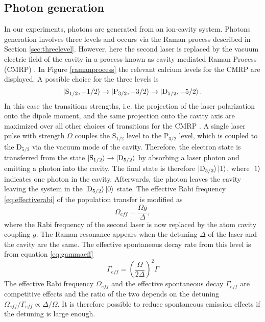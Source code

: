 \subsection{Photon generation}
\label{sec:ramanprocess}
In our experiments, photons are generated from an ion-cavity system. Photons generation involves three levels and occurs via the Raman process described in Section \ref{sec:threelevel}. However, here the second laser is replaced by the vacuum electric field of the cavity in a process known as cavity-mediated Raman Process (CMRP) \cite{stuteinterface}. In Figure \ref{ramanprocess} the relevant calcium levels for the CMRP are displayed. A possible choice for the three levels is
\begin{equation}
\ket{\text{S}_{1/2},-1/2}\to\ket{\text{P}_{3/2},-3/2} \to \ket{\text{D}_{5/2},-5/2}.
\end{equation}
In this case the transitions strengths, i.e. the projection of the laser polarization onto the dipole moment, and the same projection onto the cavity axis are maximized over all other choices of transitions for the CMRP \cite{stuteinterface}. A single laser pulse with strength $\Omega$ couples the $\text{S}_{1/2}$ level to the $\text{P}_{3/2}$ level, which is coupled to the $\text{D}_{5/2}$ via the vacuum mode of the cavity. Therefore, the electron state is transferred from the state $\ket{\text{S}_{1/2}} \to \ket{\text{D}_{5/2}}$  by absorbing a laser photon and emitting a photon into the cavity. The final state is therefore $\ket{\text{D}_{5/2}}\ket{1}$, where $\ket{1}$ indicates one photon in the cavity. Afterwards, the photon leaves the cavity leaving the system in the $\ket{\text{D}_{5/2}}\ket{0}$ state. The effective Rabi frequency \eqref{eq:effectiverabi} of the population transfer is modified as \cite{Barros2009}
\begin{equation}
\label{omegaeff}
\Omega_{eff} = \frac{\Omega g}{\Delta},
\end{equation}
where the Rabi frequency of the second laser is now replaced by the atom cavity coupling $g$. The Raman resonance appears when the detuning $\Delta$ of the laser and the cavity are the same. The effective spontaneous decay rate from this level is from equation \eqref{eq:gammaeff}
\begin{equation}
\label{gammaeff}
\Gamma_{eff} = \left(\frac{\Omega}{2\Delta}\right)^2\Gamma
\end{equation}
The effective Rabi frequency $\Omega_{eff}$ and the effective spontaneous decay $\Gamma_{eff}$ are competitive effects and the ratio of the two depends on the detuning $\Omega_{eff}/\Gamma_{eff} \propto \Delta/\Omega$. It is therefore possible to reduce spontaneous emission effects if the detuning is large enough.\\
